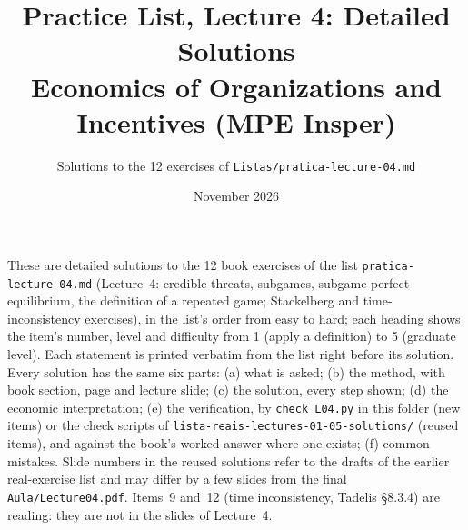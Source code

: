 \documentclass[11pt,a4paper]{article}
\title{\textbf{Practice List, Lecture 4: Detailed Solutions}\\[4pt]
  \large Economics of Organizations and Incentives (MPE Insper)}
\author{Solutions to the 12 exercises of \texttt{Listas/pratica-lecture-04.md}}
\date{November 2026}
\begin{document}
\maketitle
\thispagestyle{empty}

\noindent\sloppy These are detailed solutions to the 12 book exercises of the list
\texttt{pratica-lecture-04.md} (Lecture~4: credible threats, subgames, subgame-perfect equilibrium, the
definition of a repeated game; Stackelberg and time-inconsistency exercises), in the list's order from easy to
hard; each heading shows the item's number, level and difficulty from 1 (apply a definition) to 5 (graduate
level). Each statement is printed verbatim from the list right before its solution. Every solution has the same six parts: (a) what is
asked; (b) the method, with book section, page and lecture slide; (c) the solution, every step shown; (d) the economic
interpretation; (e) the verification, by \texttt{check\_L04.py} in this folder (new items) or the check scripts of
\texttt{lista-reais-lectures-01-05-solutions/} (reused items), and against the book's worked answer where one
exists; (f) common mistakes. Slide numbers in the reused solutions refer to the drafts of the earlier
real-exercise list and may differ by a few slides from the final \texttt{Aula/Lecture04.pdf}. Items~9 and~12
(time inconsistency, Tadelis \S8.3.4) are reading: they are not in the slides of Lecture~4.

\tableofcontents

\sollecture{\lectureivtitle}
\itemsiv
\end{document}
